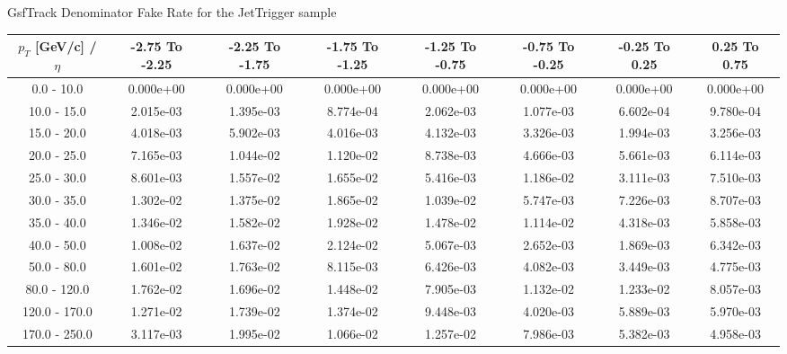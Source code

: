 \large 
GsfTrack Denominator Fake Rate for the JetTrigger sample
\footnotesize 
\begin{tabular*}{\textwidth}{|c|c|c|c|c|c|c|c|}\hline 
$p_T$ [GeV/c] / $\eta$  & -2.75 To -2.25 & -2.25 To -1.75 & -1.75 To -1.25 & -1.25 To -0.75 & -0.75 To -0.25 & -0.25 To 0.25 & 0.25 To 0.75 \\ 
 \hline 
0.0 - 10.0 & 0.000e+00 & 0.000e+00 & 0.000e+00 & 0.000e+00 & 0.000e+00 & 0.000e+00 & 0.000e+00 \\ 
10.0 - 15.0 & 2.015e-03 & 1.395e-03 & 8.774e-04 & 2.062e-03 & 1.077e-03 & 6.602e-04 & 9.780e-04 \\ 
15.0 - 20.0 & 4.018e-03 & 5.902e-03 & 4.016e-03 & 4.132e-03 & 3.326e-03 & 1.994e-03 & 3.256e-03 \\ 
20.0 - 25.0 & 7.165e-03 & 1.044e-02 & 1.120e-02 & 8.738e-03 & 4.666e-03 & 5.661e-03 & 6.114e-03 \\ 
25.0 - 30.0 & 8.601e-03 & 1.557e-02 & 1.655e-02 & 5.416e-03 & 1.186e-02 & 3.111e-03 & 7.510e-03 \\ 
30.0 - 35.0 & 1.302e-02 & 1.375e-02 & 1.865e-02 & 1.039e-02 & 5.747e-03 & 7.226e-03 & 8.707e-03 \\ 
35.0 - 40.0 & 1.346e-02 & 1.582e-02 & 1.928e-02 & 1.478e-02 & 1.114e-02 & 4.318e-03 & 5.858e-03 \\ 
40.0 - 50.0 & 1.008e-02 & 1.637e-02 & 2.124e-02 & 5.067e-03 & 2.652e-03 & 1.869e-03 & 6.342e-03 \\ 
50.0 - 80.0 & 1.601e-02 & 1.763e-02 & 8.115e-03 & 6.426e-03 & 4.082e-03 & 3.449e-03 & 4.775e-03 \\ 
80.0 - 120.0 & 1.762e-02 & 1.696e-02 & 1.448e-02 & 7.905e-03 & 1.132e-02 & 1.233e-02 & 8.057e-03 \\ 
120.0 - 170.0 & 1.271e-02 & 1.739e-02 & 1.374e-02 & 9.448e-03 & 4.020e-03 & 5.889e-03 & 5.970e-03 \\ 
170.0 - 250.0 & 3.117e-03 & 1.995e-02 & 1.066e-02 & 1.257e-02 & 7.986e-03 & 5.382e-03 & 4.958e-03 \\ 
 \hline 
\end{tabular*} 
